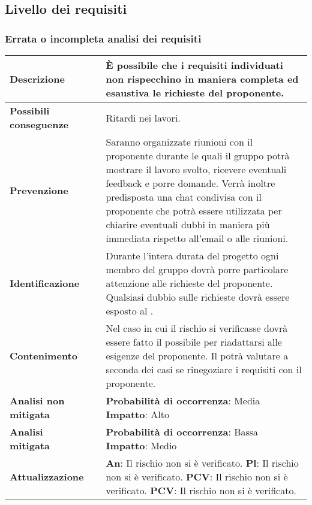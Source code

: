 	\newpage
	\subsection {Livello dei requisiti}
	\subsubsection {Errata o incompleta analisi dei requisiti}
	\label{subsec:erratiRequisiti}
	
	\small
	\begin{table}[H]
		\begin{center}			
			\begin{tabular}{p{2.5cm}p{0.5cm}p{11cm}}
				\arrayrulecolor{lightgray}
				
				\toprule				
				\textbf{Descrizione}
				& &
				È possibile che i requisiti individuati non rispecchino in maniera completa ed esaustiva le richieste del proponente.
				\\
				\midrule
				\textbf{Possibili \newline conseguenze}
				& &
				Ritardi nei lavori.
				\\
				\midrule
				\textbf{Prevenzione}
				& &
				Saranno organizzate riunioni con il proponente durante le quali il gruppo potrà mostrare il lavoro svolto, ricevere eventuali feedback e porre domande. Verrà inoltre predisposta una chat condivisa con il proponente che potrà essere utilizzata per chiarire eventuali dubbi in maniera più immediata rispetto all'email o alle riunioni.
				\\
				\midrule
				\textbf{Identificazione}
				& &
				Durante l'intera durata del progetto ogni membro del gruppo dovrà porre particolare attenzione alle richieste del proponente. Qualsiasi dubbio sulle richieste dovrà essere esposto al \responsabilediprogetto.
				\\
				\midrule
				\textbf{Contenimento}
				& &
				Nel caso in cui il rischio si verificasse dovrà essere fatto il possibile per riadattarsi alle esigenze del proponente. Il \responsabilediprogetto{} potrà valutare a seconda dei casi se rinegoziare i requisiti con il proponente.
				\\
				\midrule
				\textbf{Analisi \newline non mitigata}
				& &
				\textbf{Probabilità di occorrenza}: Media
				\newline
				\textbf{Impatto}: Alto
				\\
				\midrule
				\textbf{Analisi \newline mitigata}
				& &
				\textbf{Probabilità di occorrenza}: Bassa
				\newline
				\textbf{Impatto}: Medio
				\\
				\midrule
				\textbf{Attualizzazione}
				& &
				\textbf{An}: Il rischio non si è verificato.
				\newline
				\textbf{Pl}: Il rischio non si è verificato.
				\newline
				\textbf{PCV}: Il rischio non si è verificato.
				\newline
				\textbf{PCV}: Il rischio non si è verificato.
				\\
				

\end{tabular}
\end{center}
\end{table}
